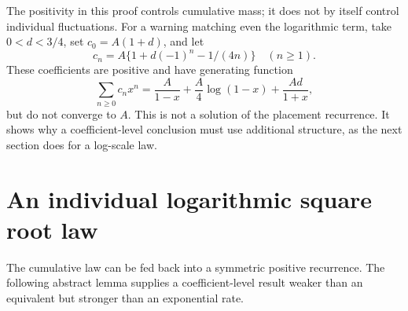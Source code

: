\documentclass[11pt,letterpaper]{article}
\theoremstyle{remark}\newtheorem{remark}[theorem]{Remark}
\numberwithin{equation}{section}
\begin{document}
The positivity in this proof controls cumulative mass; it does not by itself control individual fluctuations. For a warning matching even the logarithmic term, take $0<d<3/4$, set $c_0=A(1+d)$, and let
\[
 c_n=A\{1+d(-1)^n-1/(4n)\}\quad(n\ge1).
\]
These coefficients are positive and have generating function
\[
 \sum_{n\ge0}c_nx^n=\frac A{1-x}+\frac A4\log(1-x)+\frac{Ad}{1+x},
\]
but do not converge to $A$. This is not a solution of the placement recurrence. It shows why a coefficient-level conclusion must use additional structure, as the next section does for a log-scale law.

\section{An individual logarithmic square root law}\label{ppg:lead:sec:subpower}
The cumulative law can be fed back into a symmetric positive recurrence. The following abstract lemma supplies a coefficient-level result weaker than an equivalent but stronger than an exponential rate.
\end{document}
